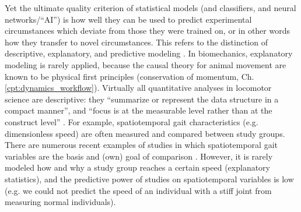 Yet the ultimate quality criterion of statistical models (and classifiers, and neural networks/``AI'') is how well they can be used to predict experimental circumstances which deviate from those they were trained on, or in other words how they transfer to novel circumstances.
This refers to the distinction of descriptive, explanatory, and predictive modeling \citep{Shmueli2010,Shmueli2011}.
In biomechanics, explanatory modeling is rarely applied, because the causal theory for animal movement are known to be physical first principles (conservation of momentum, Ch. \ref{cpt:dynamics_workflow}).
Virtually all quantitative analyses in locomotor science are descriptive: they ``summarize or represent the data structure in a compact manner'', and ``focus is at the measurable level rather than at the construct level'' \citep{Shmueli2010}.
For example, spatiotemporal gait characteristics (e.g. dimensionless speed) are often measured and compared between study groups.
There are numerous recent examples of studies in which spatiotemporal gait variables are the basis and (own) goal of comparison  \citep[e.g.][]{Cheu2022,Ekhator2023,Plocek2023,Young2023,Jones2023,Druelle2021,McHenry2023}.
However, it is rarely modeled how and why a study group reaches a certain speed (explanatory statistics), and the predictive power of studies on spatiotemporal variables is low (e.g. we could not predict the speed of an individual with a stiff joint from measuring normal individuals).


